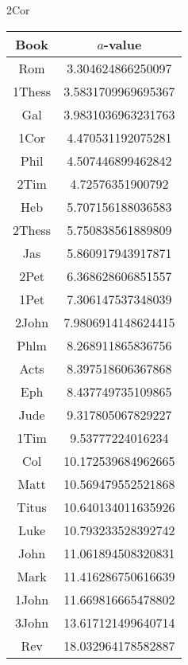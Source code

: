 \documentclass[12pt,letterpaper]{article}
\begin{document}
2Cor
\begin{longtable}{|c|c|}
\hline
 Book & $a$-value \\ \hline
Rom & 3.304624866250097 \\ \hline
 1Thess & 3.5831709969695367 \\ \hline
 Gal & 3.9831036963231763 \\ \hline
 1Cor & 4.470531192075281 \\ \hline
 Phil & 4.507446899462842 \\ \hline
 2Tim & 4.72576351900792 \\ \hline
 Heb & 5.707156188036583 \\ \hline
 2Thess & 5.750838561889809 \\ \hline
 Jas & 5.860917943917871 \\ \hline
 2Pet & 6.368628606851557 \\ \hline
 1Pet & 7.306147537348039 \\ \hline
 2John & 7.9806914148624415 \\ \hline
 Phlm & 8.268911865836756 \\ \hline
 Acts & 8.397518606367868 \\ \hline
 Eph & 8.437749735109865 \\ \hline
 Jude & 9.317805067829227 \\ \hline
 1Tim & 9.53777224016234 \\ \hline
 Col & 10.172539684962665 \\ \hline
 Matt & 10.569479552521868 \\ \hline
 Titus & 10.640134011635926 \\ \hline
 Luke & 10.793233528392742 \\ \hline
 John & 11.061894508320831 \\ \hline
 Mark & 11.416286750616639 \\ \hline
 1John & 11.669816665478802 \\ \hline
 3John & 13.617121499640714 \\ \hline
 Rev & 18.032964178582887 \\ \hline 
\end{longtable}
\end{document}
